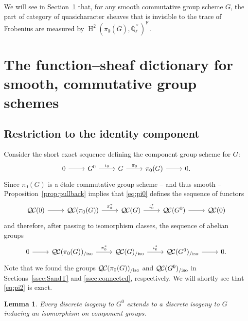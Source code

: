 \documentclass{amsart}
\theoremstyle{plain}
\newtheorem{lemma}[theorem]{Lemma}
\theoremstyle{definition}
\theoremstyle{remark}
\newcommand{\EE}{\mathbb{\bar Q}_\ell}
\newcommand{\EEx}{\EE^\times}
\newcommand{\Frob}[1]{\operatorname{F}_{#1}}
\DeclareMathOperator{\Hh}{H}
\newcommand{\QC}{{\mathcal{Q\hskip-0.8pt C}}}
\newcommand{\QCiso}[1]{\QC(#1)_{/\text{iso}}}
\newcommand{\bG}{\bar{G}}
\begin{document}
We will see in Section~\ref{sec:main} that, for any smooth commutative group scheme $G$, the part of category of quasicharacter sheaves that is invisible to the trace of Frobenius are measured by $\Hh^2(\pi_0(\bG),\EEx)^{\Frob{}}$.

\section{The function--sheaf dictionary for smooth, commutative group schemes}\label{sec:main}


\subsection{Restriction to the identity component} \label{sec:restriction}

Consider the short exact sequence
defining the component group scheme for $G$:
\begin{equation}\label{eq:pi0}
\begin{tikzcd}
0 \rar & G^0 \arrow{r}{\iota_0} & G \arrow{r}{\pi_0} & \pi_0(G) \rar & 0.
\end{tikzcd}
\end{equation}
Since $\pi_0(G)$ is a étale commutative group scheme -- and thus smooth --
Proposition~\ref{prop:pullback} implies that \eqref{eq:pi0} defines the sequence of functors
\begin{equation}\label{eq:pi1}
\begin{tikzcd}
\QC(0) \rar & \QC(\pi_0(G)) \arrow{r}{\pi_0^*} & \QC(G) \arrow{r}{\iota_0^*} & \QC(G^0) \rar & \QC(0)
\end{tikzcd}
\end{equation}
and therefore, after passing to isomorphism classes, the sequence of abelian groups
\begin{equation}\label{eq:pi2}
\begin{tikzcd}
0 \rar &
\QCiso{\pi_0(G)} \arrow{r}{\pi_0^*} & \QCiso{G} \arrow{r}{\iota_0^*} & \QCiso{G^0} \rar & 0.
\end{tikzcd}
\end{equation}
 Note that we found the groups $\QCiso{\pi_0(G)}$ and $\QCiso{G^0}$
in Sections~\ref{ssec:SandT} and \ref{ssec:connected}, respectively.
We will shortly see that \eqref{eq:pi2} is exact.


\begin{lemma}\label{lemma:ext}
Every discrete isogeny to $G^0$ extends to a discrete
isogeny to $G$ inducing an isomorphism on component groups.
\end{lemma}
\end{document}
